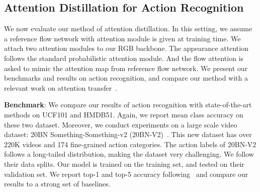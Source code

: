 \documentclass[10pt,twocolumn,letterpaper]{article}
\begin{document}
\subsection{Attention Distillation for Action Recognition}

We now evaluate our method of attention distillation. In this setting, we assume a reference flow network with attention module is given at training time. We attach two attention modules to our RGB backbone. The appearance attention follows the standard probabilistic attention module. And the flow attention is asked to mimic the attention map from reference flow network. We present our benchmarks and results on action recognition, and compare our method with a relevant work on attention transfer~\cite{Zagoruyko2017AT}.  

\noindent \textbf{Benchmark}: We compare our results of action recognition with state-of-the-art methods on UCF101 and HMDB51. Again, we report mean class accuracy on these two dataset. Moreover, we conduct experiments on a large scale video dataset: 20BN Something-Something-v2 (20BN-V2)~\cite{mahdisoltani2018fine}. This new dataset has over 220K videos and 174 fine-grained action categories. The action labels of 20BN-V2 follows a long-tailed distribution, making the dataset very challenging. We follow their data splits. Our model is trained on the training set, and tested on their validation set. We report top-1 and top-5 accuracy following~\cite{mahdisoltani2018fine,zhou2017temporal} and compare our results to a strong set of baselines.
\end{document}
